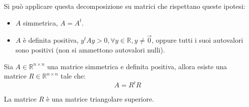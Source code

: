 Si può applicare questa decomposizione su matrici che rispettano queste ipotesi:
\begin{itemize}
    \item $A$ simmetrica, $A = A^t$.
    \item $A$ è definita positiva, $y^t A y >0, \forall y \in \mathbb{R}, y \neq \vec{0}$,
          oppure tutti i suoi autovalori sono positivi (non si ammettono
          autovalori nulli).
\end{itemize}
\begin{teorema}
    Sia $A \in \mathbb{R}^{n\times n}$ una matrice simmetrica e definita positiva,
    allora esiste una matrice $R \in \mathbb{R}^{n\times n}$ tale che:
    \begin{equation}
        A = R^t R
    \end{equation}
\end{teorema}
La matrice $R$ è una matrice triangolare superiore.
